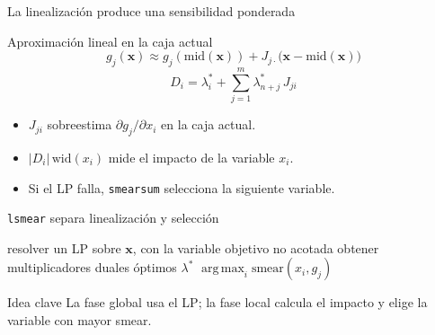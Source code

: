 \documentclass[10pt,aspectratio=169]{beamer}
\DeclareMathOperator*{\argmax}{arg\,max}
\begin{document}
\begin{frame}{La linealización produce una sensibilidad ponderada}
\small
\begin{block}{Aproximación lineal en la caja actual}
\[
g_j(\mathbf{x}) \approx g_j(\mathrm{mid}(\mathbf{x})) + J_{j\cdot}\bigl(\mathbf{x}-\mathrm{mid}(\mathbf{x})\bigr)
\]
\[
D_i=\lambda_i^*+\sum_{j=1}^{m}\lambda_{n+j}^*\,J_{ji}
\]
\end{block}

\begin{itemize}
  \item $J_{ji}$ sobreestima $\partial g_j/\partial x_i$ en la caja actual.
  \item \alert{$|D_i|\,\mathrm{wid}(x_i)$ mide el impacto de la variable $x_i$.}
  \item Si el LP falla, \texttt{smearsum} selecciona la siguiente variable.
\end{itemize}

\end{frame}

\begin{frame}{\texttt{lsmear} separa linealización y selección}
\small
\begin{algorithm}[H]
\scriptsize
{}
resolver un LP sobre $\mathbf{x}$, con la variable objetivo no acotada\;
obtener multiplicadores duales óptimos $\lambda^*$\;
\Return $\argmax_i \mathrm{smear}(x_i,g_j)$\;
\end{algorithm}

\begin{alertblock}{Idea clave}
La fase global usa el LP; la fase local calcula el impacto y elige la variable con mayor smear.
\end{alertblock}
\end{frame}
\end{document}
